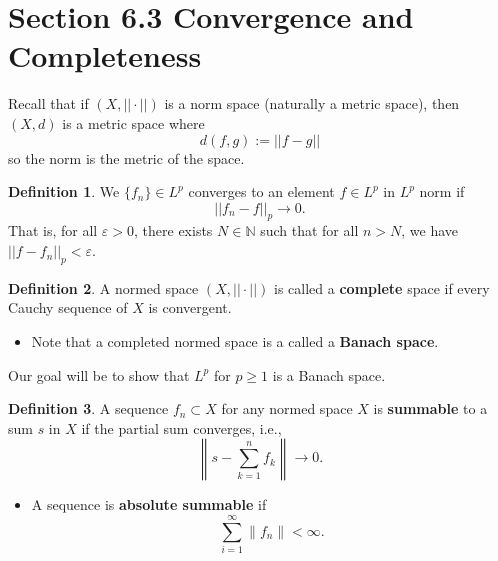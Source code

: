 \documentclass[12pt]{article}
\newcommand{\N}{\mathbb{N}}
\renewcommand{\epsilon}{\varepsilon}
\theoremstyle{definition}
\newtheorem*{definition}{Definition}
\begin{document}
\section*{Section 6.3 Convergence and Completeness}

Recall that if \( \left(X , ||\cdot||\right) \) is a norm space (naturally a metric space), then \( (X, d) \) is a metric space where 
    \[
        d(f,g) := ||f - g||  
    \]
so the norm is the metric of the space. 

\begin{definition}

    We \( \{f_n\} \in L^p \) converges to an element \( f \in L^p \) in \( L^p \) norm if 
        \[
            ||f_n - f||_{p} \to 0.   
        \]
    That is, for all \( \epsilon > 0 \), there exists \( N \in \N \) such that for all \( n > N \), we have \( ||f - f_n||_{p} < \epsilon \).
\end{definition}

\begin{definition}
    A normed space \( \left( X, ||\cdot|| \right) \) is called a \textbf{complete} space if every Cauchy sequence of \( X \) is convergent. 
    \begin{itemize}
        \item Note that a completed normed space is a called a \textbf{Banach space}.
    \end{itemize}
\end{definition}

Our goal will be to show that \( L^p \) for \( p \geq 1 \) is a Banach space. 

\begin{definition}
    A sequence \( {f_n} \subset X \) for any normed space \( X \) is \textbf{summable} to a sum \( s \) in \( X \) if the partial sum converges, i.e.,
        \[
            \left\lVert s - \sum_{k=1}^{n} f_k \right\rVert \to 0.
        \]
        \begin{itemize}
            \item A sequence is \textbf{absolute summable} if 
                \[
                    \sum_{i=1}^{\infty} \left\lVert f_n \right\rVert < \infty.  
                \]
        \end{itemize}
\end{definition}
\end{document}
